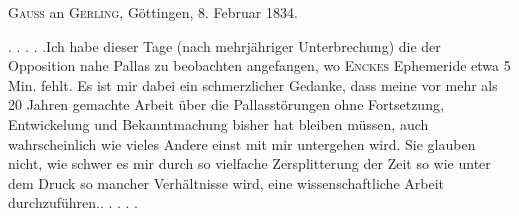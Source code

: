 \par{}\bigskip
\begin{center}
\textsc{Gauss} an \textsc{Gerling}, Göttingen, 8. Februar 1834.
\end{center}
\noindent\hspace*{\parindent}. . . . .\quad Ich habe dieser Tage (nach mehrjähriger Unterbrechung) die der Opposition nahe Pallas zu beobachten angefangen, wo \textsc{Enckes} Ephemeride etwa 5 Min. fehlt. Es ist mir dabei ein schmerzlicher Gedanke, dass meine vor mehr als 20 Jahren gemachte Arbeit über die Pallasstörungen ohne Fortsetzung, Entwickelung und Bekanntmachung bisher hat bleiben müssen, auch wahrscheinlich wie vieles Andere einst mit mir untergehen wird. Sie glauben nicht, wie schwer es mir durch so vielfache Zersplitterung der Zeit so wie unter dem Druck so mancher Verhältnisse wird, eine wissenschaftliche Arbeit durchzuführen.\quad . . . . .
\par
